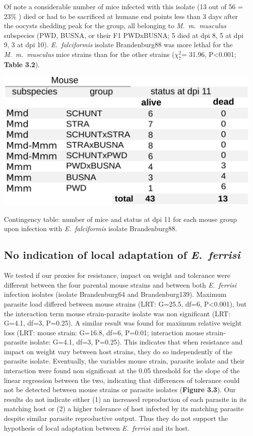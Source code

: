 Of note a considerable number of mice infected with this isolate (13 out of 56 = 23$\%$ ) died or had to be sacrificed at humane end points less than 3 days after the oocysts shedding peak for the group, all belonging to \textit{M.~m.~musculus} subspecies (PWD, BUSNA, or their F1 PWDxBUSNA; 5 died at dpi 8, 5 at dpi 9, 3 at dpi 10). \textit{E.~falciformis }isolate Brandenburg88 was more lethal for the \textit{M.~m.~musculus} mice strains than for the other strains ($\chi_{7}^{2}$= 31.96, P<0.001; \textbf{Table 3.2}).\par

\begin{table}[H]
	\centering
	\includegraphics[width=0.7\linewidth,height=\textheight,keepaspectratio]{images/3article2/Table2_final.pdf}
	\caption{Contingency table: number of mice and status at dpi 11 for each mouse group upon infection with \textit{E. falciformis} isolate Brandenburg88.}
\end{table}

\subsection{No indication of local adaptation of \textit{E.~ferrisi}}

We tested if our proxies for resistance, impact on weight and tolerance were different between the four parental mouse strains and between both \textit{E.~ferrisi} infection isolates (isolate Brandenburg64 and Brandenburg139). Maximum parasite load differed between mouse strains (LRT: G=25.5, df=6, P<0.001), but the interaction term mouse strain-parasite isolate was non significant (LRT: G=4.1, df=3, P=0.25). A similar result was found for maximum relative weight loss (LRT: mouse strain: G=16.8, df=6, P=0.01; interaction mouse strain-parasite isolate: G=4.1, df=3, P=0.25). This indicates that when resistance and impact on weight vary between host strains, they do so independently of the parasite isolate. Eventually, the variables mouse strain, parasite isolate and their interaction were found non significant at the 0.05 threshold for the slope of the linear regression between the two, indicating that differences of tolerance could not be detected between mouse strains or parasite isolates (\textbf{Figure 3.3}). Our results do not indicate either (1) an increased reproduction of each parasite in its matching host or (2) a higher tolerance of host infected by its matching parasite despite similar parasite reproductive output. Thus they do not support the hypothesis of local adaptation between \textit{E.~ferrisi} and its host.

